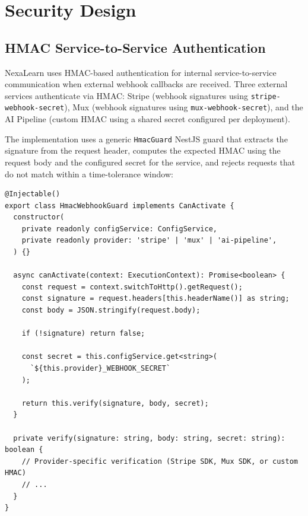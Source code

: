 
\section{Security Design}
\label{sec:security-design}

\subsection{HMAC Service-to-Service Authentication}

NexaLearn uses HMAC-based authentication for internal service-to-service communication when external webhook callbacks are received. Three external services authenticate via HMAC: Stripe (webhook signatures using \texttt{stripe-webhook-secret}), Mux (webhook signatures using \texttt{mux-webhook-secret}), and the AI Pipeline (custom HMAC using a shared secret configured per deployment).

The implementation uses a generic \texttt{HmacGuard} NestJS guard that extracts the signature from the request header, computes the expected HMAC using the request body and the configured secret for the service, and rejects requests that do not match within a time-tolerance window:

\begin{lstlisting}[caption=Generic HMAC Webhook Guard,label=lst:hmac-guard]
@Injectable()
export class HmacWebhookGuard implements CanActivate {
  constructor(
    private readonly configService: ConfigService,
    private readonly provider: 'stripe' | 'mux' | 'ai-pipeline',
  ) {}

  async canActivate(context: ExecutionContext): Promise<boolean> {
    const request = context.switchToHttp().getRequest();
    const signature = request.headers[this.headerName()] as string;
    const body = JSON.stringify(request.body);

    if (!signature) return false;

    const secret = this.configService.get<string>(
      `${this.provider}_WEBHOOK_SECRET`
    );

    return this.verify(signature, body, secret);
  }

  private verify(signature: string, body: string, secret: string): boolean {
    // Provider-specific verification (Stripe SDK, Mux SDK, or custom HMAC)
    // ...
  }
}
\end{lstlisting}

